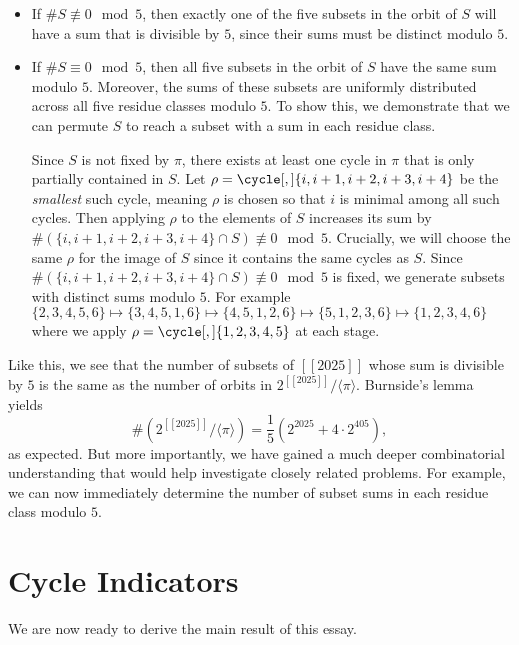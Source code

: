 \documentclass[a4paper,11pt]{article}
\numberwithin{equation}{section}
\def\llbracket{[\![}
\def\rrbracket{]\!]}
\begin{document}
    \begin{itemize}
    \item If $\# S \not \equiv 0 \mod{5}$, then exactly one of the five subsets in the orbit of $S$ will have a sum that is divisible by $5$, since their sums must be distinct modulo $5$.
    
    \item If $\# S \equiv 0 \mod{5}$, then all five subsets in the orbit of $S$ have the same sum modulo $5$. Moreover, the sums of these subsets are uniformly distributed across all five residue classes modulo $5$. To show this, we demonstrate that we can permute $S$ to reach a subset with a sum in each residue class.
    
    Since $S$ is not fixed by $\pi$, there exists at least one cycle in $\pi$ that is only partially contained in $S$. Let $\rho = \cycle[,]{i, i+1, i+2, i+3, i+4}$ be the \textit{smallest} such cycle, meaning $\rho$ is chosen so that $i$ is minimal among all such cycles. Then applying $\rho$ to the elements of $S$ increases its sum by \(\#(\{i, i+1, i+2, i+3, i+4\} \cap S)\not \equiv 0 \mod{5}\). Crucially, we will choose the same $\rho$ for the image of $S$ since it contains the same cycles as $S$. Since $\#(\{i, i+1, i+2, i+3, i+4\} \cap S) \not \equiv 0 \mod{5}$ is fixed, we generate subsets with distinct sums modulo $5$. For example $\{2,3,4,5,6\} \mapsto \{3,4,5,1,6\} \mapsto \{4,5,1,2,6\} \mapsto \{5,1,2,3,6\} \mapsto \{1,2,3,4,6\}$ where we apply $\rho=\cycle[,]{1,2,3,4,5}$ at each stage.
    \end{itemize}
    
    Like this, we see that the number of subsets of $\llbracket 2025 \rrbracket$ whose sum is divisible by $5$ is the same as the number of orbits in $2^{\llbracket 2025 \rrbracket}\text{/}\langle \pi \rangle$. Burnside's lemma yields  $$\# (2^{\llbracket 2025 \rrbracket}\text{/}\langle \pi \rangle) = \frac{1}{5}(2^{2025}+4\cdot 2^{405}),$$as expected. But more importantly, we have gained a much deeper combinatorial understanding that would help investigate closely related problems. For example, we can now immediately determine the number of subset sums in each residue class modulo $5$.
    

    \section{Cycle Indicators}

    We are now ready to derive the main result of this essay. \smallskip
\end{document}
